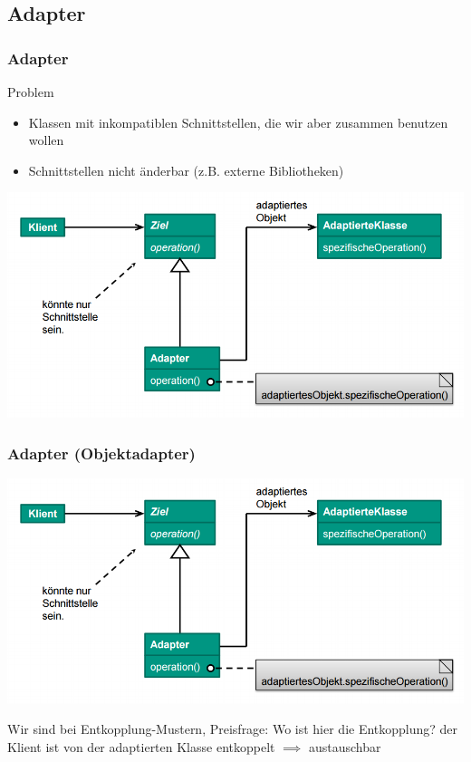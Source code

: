 \documentclass[18pt]{beamer}
\begin{document}
	\subsection{Adapter}
	\begin{frame}
		\frametitle{Adapter}
		\begin{block}{Problem}
			\begin{itemize}
				\item Klassen mit inkompatiblen Schnittstellen, die wir aber zusammen benutzen wollen 
				\item Schnittstellen nicht änderbar (z.B. externe Bibliotheken)
			\end{itemize}
		\end{block}
		\pause
		\includegraphics[scale=0.45]{./pics/tut3/adap-obj.png}
	\end{frame}

	\begin{frame}
		\frametitle{Adapter (Objektadapter)}
		\includegraphics[scale=0.45]{./pics/tut3/adap-obj.png}
		\begin{block}{Wir sind bei Entkopplung-Mustern, Preisfrage:}
			Wo ist hier die Entkopplung?
			\pause
			\linebreak der Klient ist von der adaptierten Klasse entkoppelt $\implies$ austauschbar
		\end{block}
	\end{frame}
\end{document}
